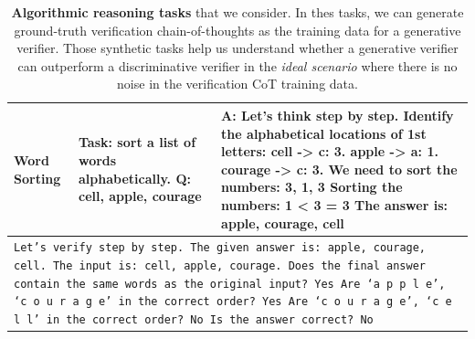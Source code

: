 \begin{table}[ht]
\begin{tabular}{ | p{2.8cm} | p{6cm} | p{6.5cm} | }
\textbf{Word Sorting} & 
Task: sort a list of words alphabetically.\newline
Q: cell, apple, courage
&
A: Let's think step by step.\newline
Identify the alphabetical locations of 1st letters:\newline
cell -> c: 3. apple -> a: 1. courage -> c: 3.\newline
We need to sort the numbers: 3, 1, 3\newline
Sorting the numbers: 1 < 3 = 3\newline
The answer is: apple, courage, cell
\\ \midrule\multicolumn{3}{|p{15cm}|}{
\texttt{{Let's verify step by step.}
\newline
The given answer is: apple, courage, cell. The input is: cell, apple, courage.\newline
Does the final answer contain the same words as the original input? Yes \newline
Are `a p p l e', `c o u r a g e' in the correct order? Yes \newline
Are `c o u r a g e', `c e l l' in the correct order? No \newline
Is the answer correct? No
}} \\ \midrule
\end{tabular}
\caption{\textbf{Algorithmic reasoning tasks} that we consider. In thes tasks, we can generate ground-truth verification chain-of-thoughts as the training data for a generative verifier. Those synthetic tasks help us understand whether a generative verifier can outperform a discriminative verifier in the \textit{ideal scenario} where there is no noise in the verification CoT training data.}
\label{tab:synthetic}
\end{table}


